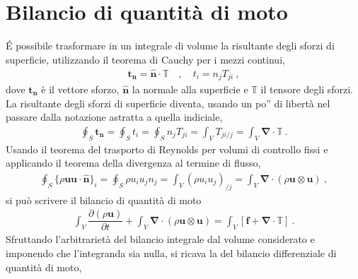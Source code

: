\documentclass[letterpaper,10pt,italian]{jupyterBook}
\begin{document}
\section{Bilancio di quantità di moto}
\label{\detokenize{polimi/fluidmechanics-ita/template/capitoli/04_bilanci/04teoria:bilancio-di-quantita-di-moto}}
\sphinxAtStartPar
É possibile trasformare in un integrale di volume la risultante degli
sforzi di superficie, utilizzando il teorema di Cauchy per i mezzi
continui,
\begin{equation*}
\begin{split}\mathbf{t_n} = \mathbf{\hat{n}} \cdot \mathbb{T} \quad , \quad 
  t_i = n_j T_{ji} \ ,\end{split}
\end{equation*}
\sphinxAtStartPar
dove \(\mathbf{t_n}\) è il vettore sforzo,
\(\mathbf{\hat{n}}\) la normale alla superficie e \(\mathbb{T}\) il tensore
degli sforzi. La risultante degli sforzi di superficie diventa, usando
un po” di libertà nel passare dalla notazione astratta a quella
indiciale,
\begin{equation*}
\begin{split}\oint_S \mathbf{t_n} = \oint_S t_i = \oint_S n_j T_{ji} =
  \int_V T_{ji/j} = \int_V \mathbf{\nabla} \cdot \mathbb{T} \ .\end{split}
\end{equation*}
\sphinxAtStartPar
Usando il
teorema del trasporto di Reynolds per volumi di controllo fissi e
applicando il teorema della divergenza al termine di flusso,
\begin{equation*}
\begin{split}\oint_S \big\{ \rho \mathbf{u} \mathbf{u} \cdot \mathbf{\hat{n}} \big\}_i = \oint_S \rho u_i u_j n_j = \int_V (\rho u_i u_j)_{/j} = \int_{V} \mathbf{\nabla} \cdot ( \rho \mathbf{u} \otimes \mathbf{u} ) \ ,\end{split}
\end{equation*}
\sphinxAtStartPar
si può scrivere il bilancio di quantità di moto
\begin{equation*}
\begin{split}\displaystyle\int_{V} \dfrac{\partial(\rho \mathbf{u})}{\partial t}  + \int_{V} \mathbf{\nabla} \cdot ( \rho \mathbf{u} \otimes \mathbf{u} ) = \int_{V} \left[ \mathbf{f} +  \mathbf{\nabla} \cdot \mathbb{T} \right] \ .\end{split}
\end{equation*}
\sphinxAtStartPar
Sfruttando l’arbitrarietà del bilancio integrale dal volume considerato
e imponendo che l’integranda sia nulla, si ricava la  del bilancio differenziale di quantità di moto,
\end{document}
